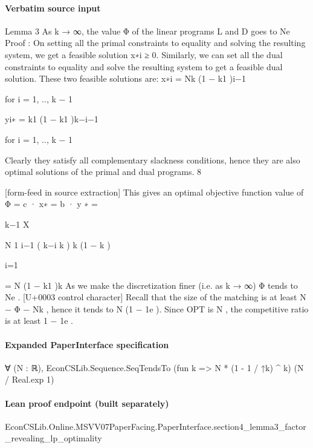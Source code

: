 \documentclass[10pt]{article}
\begin{document}
\paragraph{Verbatim source input}
\begin{ReviewVerbatim}
Lemma 3 As k → ∞, the value Φ of the linear programs L and D goes to Ne
Proof : On setting all the primal constraints to equality and solving the resulting system,
we get a feasible solution x∗i ≥ 0. Similarly, we can set all the dual constraints to equality and
solve the resulting system to get a feasible dual solution.
These two feasible solutions are:
x∗i = Nk (1 − k1 )i−1

for i = 1, .., k − 1

yi∗ = k1 (1 − k1 )k−i−1

for i = 1, .., k − 1

Clearly they satisfy all complementary slackness conditions, hence they are also optimal solutions of the primal and dual programs.
8


[form-feed in source extraction]
This gives an optimal objective function value of
Φ = c · x∗ = b · y ∗
=

k−1
X

N
1 i−1
( k−i
k ) k (1 − k )

i=1

= N (1 − k1 )k
As we make the discretization finer (i.e. as k → ∞) Φ tends to Ne .
[U+0003 control character]
Recall that the size of the matching is at least N − Φ − Nk , hence it tends to N (1 − 1e ). Since
OPT is N , the competitive ratio is at least 1 − 1e .
\end{ReviewVerbatim}


\paragraph{Expanded PaperInterface specification}
\begin{ReviewVerbatim}
∀ (N : ℝ), EconCSLib.Sequence.SeqTendsTo (fun k => N * (1 - 1 / ↑k) ^ k) (N / Real.exp 1)
\end{ReviewVerbatim}

\paragraph{Lean proof endpoint (built separately)}\begin{ReviewVerbatim}
EconCSLib.Online.MSVV07PaperFacing.PaperInterface.section4_lemma3_factor_revealing_lp_optimality
\end{ReviewVerbatim}
\end{document}
